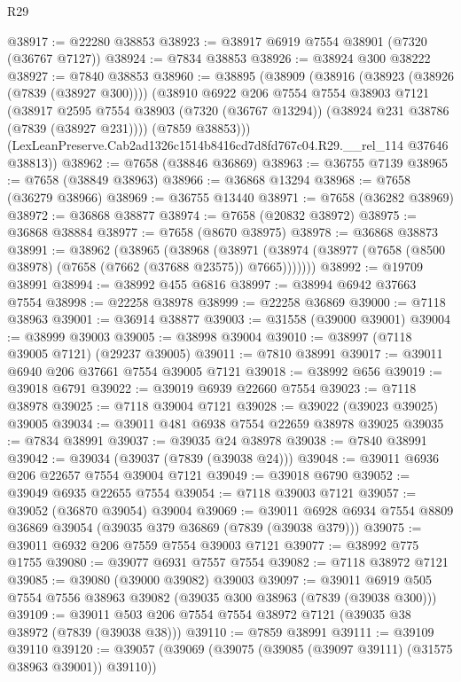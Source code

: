 \begin{lexlean}{R29}
\begin{coremodule}
@38917 := @22280 @38853
@38923 := @38917 @6919 @7554 @38901 (@7320 (@36767 @7127))
@38924 := @7834 @38853
@38926 := @38924 @300 @38222
@38927 := @7840 @38853
@38960 := @38895
    (@38909
      (@38916
        (@38923 (@38926 (@7839 (@38927 @300))))
        (@38910
          @6922
          @206
          @7554
          @7554
          @38903
          @7121
          (@38917
            @2595
            @7554
            @38903
            (@7320 (@36767 @13294))
            (@38924 @231 @38786 (@7839 (@38927 @231))))
          (@7859 @38853)))
      (LexLeanPreserve.Cab2ad1326c1514b8416cd7d8fd767c04.R29.__rel_114 @37646 @38813))
@38962 := @7658 (@38846 @36869)
@38963 := @36755 @7139
@38965 := @7658 (@38849 @38963)
@38966 := @36868 @13294
@38968 := @7658 (@36279 @38966)
@38969 := @36755 @13440
@38971 := @7658 (@36282 @38969)
@38972 := @36868 @38877
@38974 := @7658 (@20832 @38972)
@38975 := @36868 @38884
@38977 := @7658 (@8670 @38975)
@38978 := @36868 @38873
@38991 := @38962
    (@38965
      (@38968
        (@38971 (@38974 (@38977 (@7658 (@8500 @38978) (@7658 (@7662 (@37688 @23575)) @7665)))))))
@38992 := @19709 @38991
@38994 := @38992 @455 @6816
@38997 := @38994 @6942 @37663 @7554
@38998 := @22258 @38978
@38999 := @22258 @36869
@39000 := @7118 @38963
@39001 := @36914 @38877
@39003 := @31558 (@39000 @39001)
@39004 := @38999 @39003
@39005 := @38998 @39004
@39010 := @38997 (@7118 @39005 @7121) (@29237 @39005)
@39011 := @7810 @38991
@39017 := @39011 @6940 @206 @37661 @7554 @39005 @7121
@39018 := @38992 @656
@39019 := @39018 @6791
@39022 := @39019 @6939 @22660 @7554
@39023 := @7118 @38978
@39025 := @7118 @39004 @7121
@39028 := @39022 (@39023 @39025) @39005
@39034 := @39011 @481 @6938 @7554 @22659 @38978 @39025
@39035 := @7834 @38991
@39037 := @39035 @24 @38978
@39038 := @7840 @38991
@39042 := @39034 (@39037 (@7839 (@39038 @24)))
@39048 := @39011 @6936 @206 @22657 @7554 @39004 @7121
@39049 := @39018 @6790
@39052 := @39049 @6935 @22655 @7554
@39054 := @7118 @39003 @7121
@39057 := @39052 (@36870 @39054) @39004
@39069 := @39011 @6928 @6934 @7554 @8809 @36869 @39054 (@39035 @379 @36869 (@7839 (@39038 @379)))
@39075 := @39011 @6932 @206 @7559 @7554 @39003 @7121
@39077 := @38992 @775 @1755
@39080 := @39077 @6931 @7557 @7554
@39082 := @7118 @38972 @7121
@39085 := @39080 (@39000 @39082) @39003
@39097 := @39011 @6919 @505 @7554 @7556 @38963 @39082 (@39035 @300 @38963 (@7839 (@39038 @300)))
@39109 := @39011 @503 @206 @7554 @7554 @38972 @7121 (@39035 @38 @38972 (@7839 (@39038 @38)))
@39110 := @7859 @38991
@39111 := @39109 @39110
@39120 := @39057 (@39069 (@39075 (@39085 (@39097 @39111) (@31575 @38963 @39001)) @39110))

\end{coremodule}
\end{lexlean}
